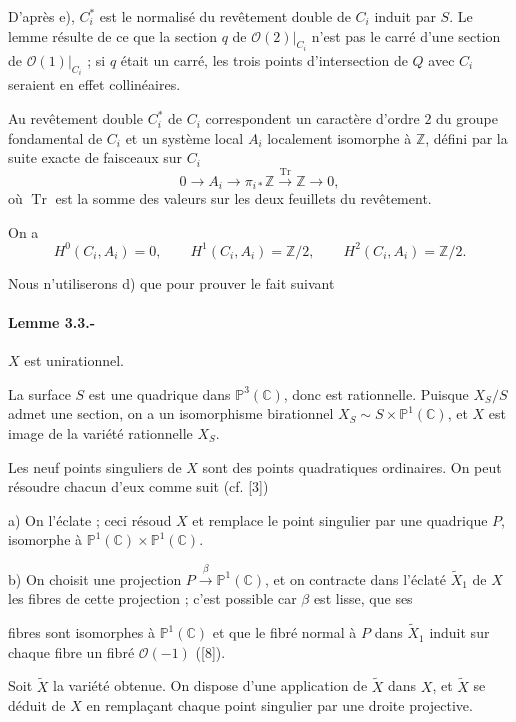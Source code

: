 \documentclass[10pt]{article}
\newcommand{\C}{\mathbb C}
\newcommand{\PP}{\mathbb P}
\newcommand{\ZZ}{\mathbb Z}
\newcommand{\OO}{\mathcal O}
\newcommand{\Tr}{\operatorname{Tr}}
\newcommand{\sourcequote}[1]{\textquotedbl#1\textquotedbl}
\begin{document}
D'après e), \(C_i^*\) est le normalisé du revêtement double de \(C_i\) induit par \(S\). Le lemme résulte de ce que la section \(q\) de \(\OO(2)|_{C_i}\) n'est pas le carré d'une section de \(\OO(1)|_{C_i}\) ; si \(q\) était un carré, les trois points d'intersection de \(Q\) avec \(C_i\) seraient en effet collinéaires.

Au revêtement double \(C_i^*\) de \(C_i\) correspondent un caractère d'ordre \(2\) du groupe fondamental de \(C_i\) et un système local \(A_i\) localement isomorphe à \(\ZZ\), défini par la suite exacte de faisceaux sur \(C_i\)
\[
  0\longrightarrow A_i\longrightarrow\pi_{i*}\ZZ
  \xrightarrow{\Tr}\ZZ\longrightarrow0,
\]
où \(\Tr\) est la \sourcequote{somme des valeurs sur les deux feuillets du revêtement}.

On a
\[
  \tag{3.2}
  H^0(C_i,A_i)=0,
  \qquad H^1(C_i,A_i)=\ZZ/2,
  \qquad H^2(C_i,A_i)=\ZZ/2.
\]

Nous n'utiliserons d) que pour prouver le fait suivant

\paragraph{Lemme 3.3.-} \(X\) est unirationnel.

La surface \(S\) est une quadrique dans \(\PP^3(\C)\), donc est rationnelle. Puisque \(X_S/S\) admet une section, on a un isomorphisme birationnel \(X_S\sim S\times\PP^1(\C)\), et \(X\) est image de la variété rationnelle \(X_S\).

Les neuf points singuliers de \(X\) sont des points quadratiques ordinaires. On peut résoudre chacun d'eux comme suit (cf. [3])

\noindent a) On l'éclate ; ceci résoud \(X\) et remplace le point singulier par une quadrique \(P\), isomorphe à \(\PP^1(\C)\times\PP^1(\C)\).

\noindent b) On choisit une projection \(P\xrightarrow{\beta}\PP^1(\C)\), et on contracte dans l'éclaté \(\widetilde X_1\) de \(X\) les fibres de cette projection ; c'est possible car \(\beta\) est lisse, que ses

\newpage
\noindent fibres sont isomorphes à \(\PP^1(\C)\) et que le fibré normal à \(P\) dans \(\widetilde X_1\) induit sur chaque fibre un fibré \(\OO(-1)\) ([8]).

Soit \(\widetilde X\) la variété obtenue. On dispose d'une application de \(\widetilde X\) dans \(X\), et \(\widetilde X\) se déduit de \(X\) en remplaçant chaque point singulier par une droite projective.
\end{document}
